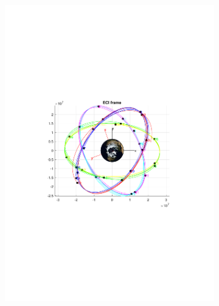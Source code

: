\begin{figure}[!h]
\begin{subfigure}[t]{0.49\linewidth}
\includegraphics[trim=4cm 10cm 4cm 9cm,clip,width=\linewidth]{ChapterLiteratureReview/GPS_ECI_top}
\end{subfigure}
\end{figure}


